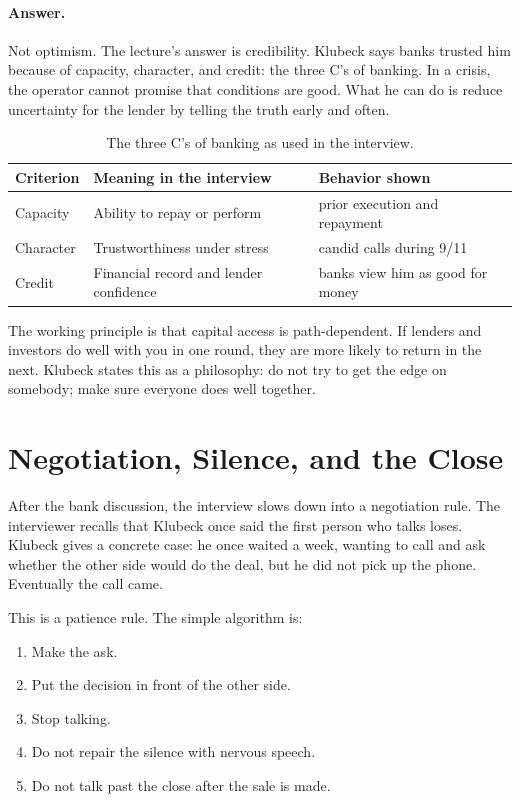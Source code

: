 \paragraph{Answer.}
Not optimism. The lecture's answer is credibility. Klubeck says banks trusted him because of capacity, character, and credit: the three C's of banking. In a crisis, the operator cannot promise that conditions are good. What he can do is reduce uncertainty for the lender by telling the truth early and often.

\begin{table}
\centering
\begin{tabular}{lll}
\hline
Criterion & Meaning in the interview & Behavior shown \\
\hline
Capacity & Ability to repay or perform & prior execution and repayment \\
Character & Trustworthiness under stress & candid calls during 9/11 \\
Credit & Financial record and lender confidence & banks view him as good for money \\
\hline
\end{tabular}
\caption{The three C's of banking as used in the interview.}
\end{table}

The working principle is that capital access is path-dependent. If lenders and investors do well with you in one round, they are more likely to return in the next. Klubeck states this as a philosophy: do not try to get the edge on somebody; make sure everyone does well together.

\section{Negotiation, Silence, and the Close}

After the bank discussion, the interview slows down into a negotiation rule. The interviewer recalls that Klubeck once said the first person who talks loses. Klubeck gives a concrete case: he once waited a week, wanting to call and ask whether the other side would do the deal, but he did not pick up the phone. Eventually the call came.

This is a patience rule. The simple algorithm is:
\begin{enumerate}
\item Make the ask.
\item Put the decision in front of the other side.
\item Stop talking.
\item Do not repair the silence with nervous speech.
\item Do not talk past the close after the sale is made.
\end{enumerate}

